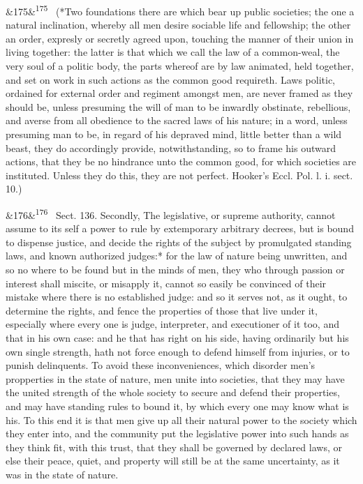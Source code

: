 \documentclass[12pt]{article}
\newcommand{\para}[1][]{\par\noindent\ifx&#1&\else\textsuperscript{\footnotesize #1}~\fi}
\begin{document}
\para[175] (*Two foundations there are which bear up public societies; the one a natural inclination, whereby all men desire sociable life and fellowship; the other an order, expresly or secretly agreed upon, touching the manner of their union in living together: the latter is that which we call the law of a common-weal, the very soul of a politic body, the parts whereof are by law animated, held together, and set on work in such actions as the common good requireth. Laws politic, ordained for external order and regiment amongst men, are never framed as they should be, unless presuming the will of man to be inwardly obstinate, rebellious, and averse from all obedience to the sacred laws of his nature; in a word, unless presuming man to be, in regard of his depraved mind, little better than a wild beast, they do accordingly provide, notwithstanding, so to frame his outward actions, that they be no hindrance unto the common good, for which societies are instituted. Unless they do this, they are not perfect. Hooker's Eccl. Pol. l. i. sect. 10.)

\para[176] Sect. 136. Secondly, The legislative, or supreme authority, cannot assume to its self a power to rule by extemporary arbitrary decrees, but is bound to dispense justice, and decide the rights of the subject by promulgated standing laws, and known authorized judges:* for the law of nature being unwritten, and so no where to be found but in the minds of men, they who through passion or interest shall miscite, or misapply it, cannot so easily be convinced of their mistake where there is no established judge: and so it serves not, as it ought, to determine the rights, and fence the properties of those that live under it, especially where every one is judge, interpreter, and executioner of it too, and that in his own case: and he that has right on his side, having ordinarily but his own single strength, hath not force enough to defend himself from injuries, or to punish delinquents. To avoid these inconveniences, which disorder men's propperties in the state of nature, men unite into societies, that they may have the united strength of the whole society to secure and defend their properties, and may have standing rules to bound it, by which every one may know what is his. To this end it is that men give up all their natural power to the society which they enter into, and the community put the legislative power into such hands as they think fit, with this trust, that they shall be governed by declared laws, or else their peace, quiet, and property will still be at the same uncertainty, as it was in the state of nature.
\end{document}
